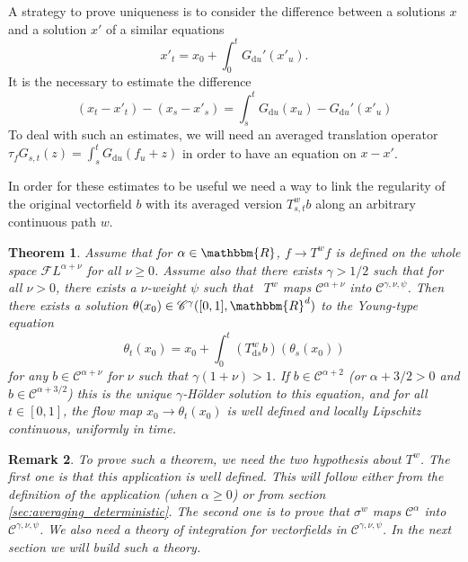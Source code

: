 \documentclass[a4paper,11pt]{article}
\newcommand{\mathd}{\mathrm{d}}
\newtheorem{theorem}{Theorem}[section]
\newtheorem{remark}[theorem]{Remark}
\newcommand{\CC}{\mathscr C}
\newcommand{\CF}{\mathscr F}
\begin{document}
A strategy to prove uniqueness is to consider the difference between a
solutions $x$ and a solution $x'$ of a similar equations
\[ x'_{t} =x_{0} + \int_{0}^{t} G_{\mathd u}' (x'_{u} ) . \]
It is the necessary to estimate the difference
\[ (x_{t} -x'_{t} ) - (x_{s} -x'_{s} ) = \int_{s}^{t} G_{\mathd u} (x_{u} )
   -G_{\mathd u}' (x'_{u} ) \]
To deal with such an estimates, we will need an averaged translation operator
$\tau_{f}  G_{s,t} ( z ) = \int_{s}^{t} G_{\mathd u} ( f_{u} +z )$ in order to
have an equation on $x-x'$.

In order for these estimates to be useful we need a way to link the
regularity of the original vectorfield $b$ with its averaged version
$T^{w}_{s,t} b$ along an arbitrary continuous path $w$.

\begin{theorem}
  Assume that for $\alpha \in \mathbbm{R}$, $f \to T^{w} f$ is defined on the
  whole space $\CF L^{\alpha + \nu}$ for all $\nu \geqslant 0$. Assume also
  that there exists $\gamma >1/2$ such that for all $\nu >0$, there exists a
  $\nu$-weight $\psi$ such that \ $T^{w}$ maps $\CC^{\alpha + \nu}$ into
  $\CC^{\gamma , \nu , \psi}$. Then there exists a solution $\theta (x_{0} )
  \in \CC^{\gamma} ([0,1],\mathbbm{R}^{d} )$ to the Young-type equation
  \[ \theta_{t} (x_{0} ) =x_{0} + \int_{0}^{t} (T^{w}_{\mathd s} b) (
     \theta_{s} (x_{0} )) \]
  for any $b \in \CC^{\alpha + \nu}$ for $\nu$ such that $\gamma ( 1+ \nu )
  >1$. If $b \in \CC^{\alpha +2}$ (or $\alpha +3/2>0$ and $b \in \CC^{\alpha
  +3/2}$) this is the unique $\gamma$-H\"older solution to this equation, and
  for all $t \in [0,1]$, the flow map $x_{0} \to \theta_{t} (x_{0} )$ is well
  defined and locally Lipschitz continuous, uniformly in time.
\end{theorem}

\begin{remark}
  To prove such a theorem, we need the two hypothesis about $T^{w}$. The first
  one is that this application is well defined. This will follow either from
  the definition of the application (when $\alpha \ge 0$) or from section
  \ref{sec:averaging_deterministic}. The second one is to prove that $\sigma^{w}$ maps
  $\CC^{\alpha}$ into $\CC^{\gamma , \nu , \psi}$. We also need a theory of
  integration for vectorfields in $\CC^{\gamma , \nu , \psi}$. In the next
  section we will build such a theory.
\end{remark}
\end{document}
